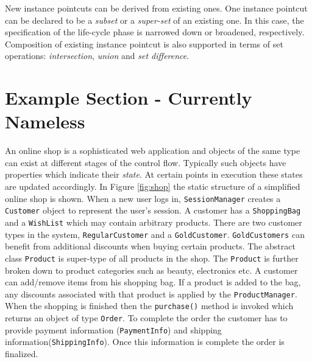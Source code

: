 \documentclass{llncs}
\begin{document}
New instance pointcuts can be derived from existing ones. One instance pointcut can be declared to be a \emph{subset} or a \emph{super-set} of an existing one.
In this case, the specification of the life-cycle phase is narrowed down or broadened, respectively.
Composition of existing instance pointcut is also supported in terms of set operations: \emph{intersection}, \emph{union} and \emph{set difference}. 





\section{Example Section - Currently Nameless}
\label{sect:onlineshop}
An online shop is a sophisticated web application and objects of the same type can exist at different stages of the control flow. Typically such objects have properties which indicate their \emph{state}. At certain points in execution these states are updated  accordingly. In Figure \ref{fig:shop} the static structure of a simplified online shop is shown. When a new user logs in, \texttt{SessionManager} creates a \texttt{Customer} object to represent the user's session. A customer has a \texttt{ShoppingBag} and a \texttt{WishList} which may contain arbitrary products. There are two customer types in the system, \texttt{RegularCustomer} and a \texttt{GoldCustomer}. \texttt{GoldCustomers} can benefit from additional discounts when buying certain products. The abstract class \texttt{Product} is super-type of all products in the shop. The \texttt{Product} is further broken down to product categories such as beauty, electronics etc. A customer can add/remove items from his shopping bag. If a product is added to the bag, any discounts associated with that product is applied by the \texttt{ProductManager}. When the shopping is finished then the \texttt{purchase()} method is invoked which returns an object of type \texttt{Order}. To complete the order the customer has to provide payment information (\texttt{PaymentInfo}) and shipping information(\texttt{ShippingInfo}). Once this information is complete the order is finalized. 
\end{document}
